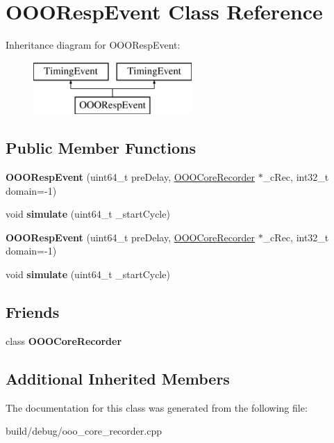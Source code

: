\hypertarget{classOOORespEvent}{\section{O\-O\-O\-Resp\-Event Class Reference}
\label{classOOORespEvent}
}
Inheritance diagram for O\-O\-O\-Resp\-Event\-:\begin{figure}[H]
\begin{center}
\leavevmode
\includegraphics[height=2.000000cm]{classOOORespEvent}
\end{center}
\end{figure}
\subsection*{Public Member Functions}
\begin{DoxyCompactItemize}
\item 
\hypertarget{classOOORespEvent_a0b0b60c2c1674662e6765a69098071a6}{{\bfseries O\-O\-O\-Resp\-Event} (uint64\-\_\-t pre\-Delay, \hyperlink{classOOOCoreRecorder}{O\-O\-O\-Core\-Recorder} $\ast$\-\_\-c\-Rec, int32\-\_\-t domain=-\/1)}\label{classOOORespEvent_a0b0b60c2c1674662e6765a69098071a6}

\item 
\hypertarget{classOOORespEvent_a97234f26e90f16fd0a671cb794b44f72}{void {\bfseries simulate} (uint64\-\_\-t \-\_\-start\-Cycle)}\label{classOOORespEvent_a97234f26e90f16fd0a671cb794b44f72}

\item 
\hypertarget{classOOORespEvent_a0b0b60c2c1674662e6765a69098071a6}{{\bfseries O\-O\-O\-Resp\-Event} (uint64\-\_\-t pre\-Delay, \hyperlink{classOOOCoreRecorder}{O\-O\-O\-Core\-Recorder} $\ast$\-\_\-c\-Rec, int32\-\_\-t domain=-\/1)}\label{classOOORespEvent_a0b0b60c2c1674662e6765a69098071a6}

\item 
\hypertarget{classOOORespEvent_a97234f26e90f16fd0a671cb794b44f72}{void {\bfseries simulate} (uint64\-\_\-t \-\_\-start\-Cycle)}\label{classOOORespEvent_a97234f26e90f16fd0a671cb794b44f72}

\end{DoxyCompactItemize}
\subsection*{Friends}
\begin{DoxyCompactItemize}
\item 
\hypertarget{classOOORespEvent_ab288e24cc9cca52ebb627d4c18aaa2fa}{class {\bfseries O\-O\-O\-Core\-Recorder}}\label{classOOORespEvent_ab288e24cc9cca52ebb627d4c18aaa2fa}

\end{DoxyCompactItemize}
\subsection*{Additional Inherited Members}


The documentation for this class was generated from the following file\-:\begin{DoxyCompactItemize}
\item 
build/debug/ooo\-\_\-core\-\_\-recorder.\-cpp\end{DoxyCompactItemize}
